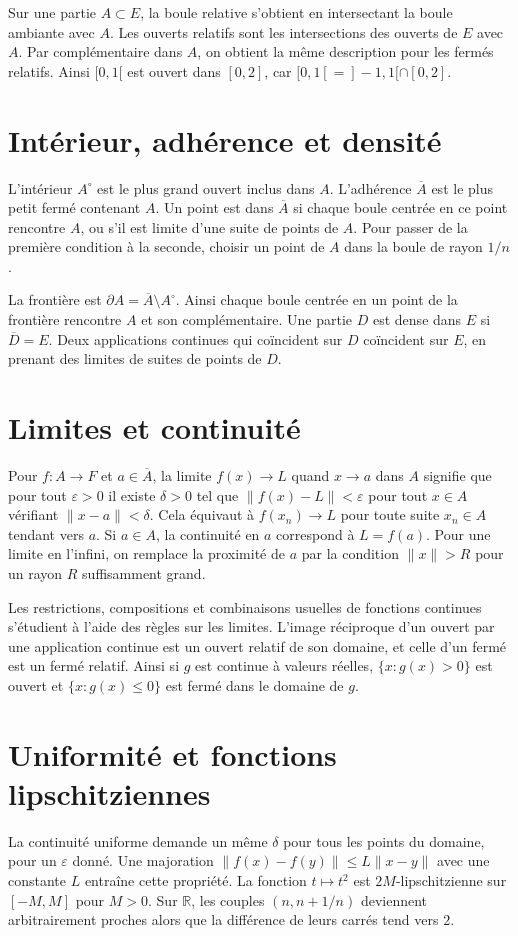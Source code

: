 \documentclass[11pt,a4paper]{article}
\begin{document}
Sur une partie $A\subset E$, la boule relative s’obtient en intersectant la boule ambiante avec $A$. Les ouverts relatifs sont les intersections des ouverts de $E$ avec $A$. Par complémentaire dans $A$, on obtient la même description pour les fermés relatifs. Ainsi $[0,1[$ est ouvert dans $[0,2]$, car $[0,1[=]-1,1[\cap[0,2]$.

\section*{Intérieur, adhérence et densité}
L’intérieur $A^\circ$ est le plus grand ouvert inclus dans $A$. L’adhérence $\overline A$ est le plus petit fermé contenant $A$. Un point est dans $\overline A$ si chaque boule centrée en ce point rencontre $A$, ou s’il est limite d’une suite de points de $A$. Pour passer de la première condition à la seconde, choisir un point de $A$ dans la boule de rayon $1/n$.

La frontière est $\partial A=\overline A\setminus A^\circ$. Ainsi chaque boule centrée en un point de la frontière rencontre $A$ et son complémentaire. Une partie $D$ est dense dans $E$ si $\overline D=E$. Deux applications continues qui coïncident sur $D$ coïncident sur $E$, en prenant des limites de suites de points de $D$.

\section*{Limites et continuité}
Pour $f:A\to F$ et $a\in\overline A$, la limite $f(x)\to L$ quand $x\to a$ dans $A$ signifie que pour tout $\varepsilon>0$ il existe $\delta>0$ tel que $\|f(x)-L\|<\varepsilon$ pour tout $x\in A$ vérifiant $\|x-a\|<\delta$. Cela équivaut à $f(x_n)\to L$ pour toute suite $x_n\in A$ tendant vers $a$. Si $a\in A$, la continuité en $a$ correspond à $L=f(a)$. Pour une limite en l’infini, on remplace la proximité de $a$ par la condition $\|x\|>R$ pour un rayon $R$ suffisamment grand.

Les restrictions, compositions et combinaisons usuelles de fonctions continues s’étudient à l’aide des règles sur les limites. L’image réciproque d’un ouvert par une application continue est un ouvert relatif de son domaine, et celle d’un fermé est un fermé relatif. Ainsi si $g$ est continue à valeurs réelles, $\{x:g(x)>0\}$ est ouvert et $\{x:g(x)\le0\}$ est fermé dans le domaine de $g$.

\section*{Uniformité et fonctions lipschitziennes}
La continuité uniforme demande un même $\delta$ pour tous les points du domaine, pour un $\varepsilon$ donné. Une majoration $\|f(x)-f(y)\|\le L\|x-y\|$ avec une constante $L$ entraîne cette propriété. La fonction $t\mapsto t^2$ est $2M$-lipschitzienne sur $[-M,M]$ pour $M>0$. Sur $\mathbb R$, les couples $(n,n+1/n)$ deviennent arbitrairement proches alors que la différence de leurs carrés tend vers $2$.
\end{document}
